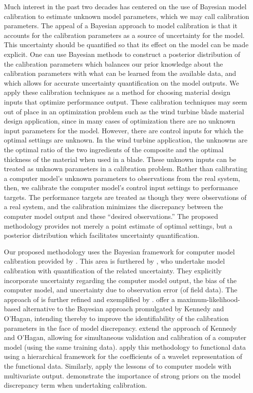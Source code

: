\documentclass[12pt]{article}
\begin{document}
Much interest in the past two decades has centered on the use of Bayesian model calibration to estimate unknown model parameters, which we may call calibration parameters. 
%
The appeal of a Bayesian approach to model calibration is that it accounts for the calibration parameters as a source of uncertainty for the model. 
%
This uncertainty should be quantified so that its effect on the model can be made explicit. 
%
One can use Bayesian methods to construct a posterior distribution of the calibration parameters which balances our prior knowledge about the calibration parameters with what can be learned from the available data, and which allows for accurate uncertainty quantification on the model outputs. 
%
We apply these calibration techniques as a method for choosing material design inputs that optimize performance output.
%
These calibration techniques may seem out of place in an optimization problem such as the wind turbine blade material design application, since in many cases of optimization there are no unknown input parameters for the model. 
%
However, there are control inputs for which the optimal settings are unknown.
%
In the wind turbine application, the unknowns are the optimal ratio of the two ingredients of the composite and the optimal thickness of the material when used in a blade.
%
These unknown inputs can be treated as unknown parameters in a calibration problem.
%
Rather than calibrating a computer model's unknown parameters to observations from the real system, then, we calibrate the computer model's control input settings to performance targets.
%
The performance targets are treated as though they were observations of a real system, and the calibration minimizes the discrepancy between the computer model output and these ``desired observations.''
%
The proposed methodology provides not merely a point estimate of optimal settings, but a posterior distribution which facilitates uncertainty quantification.

Our proposed methodology uses the Bayesian framework for computer model calibration provided by  \cite{Kennedy2001}.
% 
This area is furthered by \cite{Higdon2004}, who undertake model calibration with quantification of the related uncertainty. 
They explicitly incorporate uncertainty regarding the computer model output, the bias of the computer model, and uncertainty due to observation error (of field data). 
%
The approach of \cite{Higdon2004} is further refined and exemplified by \cite{Williams2006}.
%
\cite{Loeppky2006} offer a maximum-likelihood-based alternative to the Bayesian approach promulgated by Kennedy and O'Hagan, intending thereby to improve the identifiability of the calibration parameters in the face of model discrepancy. 
%
\cite{Bayarri2007} extend the approach of Kennedy and O'Hagan, allowing for simultaneous validation and calibration of a computer model (using the same training data). 
%
\cite{Bayarri} apply this methodology to functional data using a hierarchical framework for the coefficients of a wavelet representation of the functional data. 
%
Similarly, \cite{Paulo2012} apply the lessons of \cite{Bayarri2007} to computer models with multivariate output.
%
\cite{Brynjarsdottir2014} demonstrate the importance of strong priors on the model discrepancy term when undertaking calibration.
\end{document}
